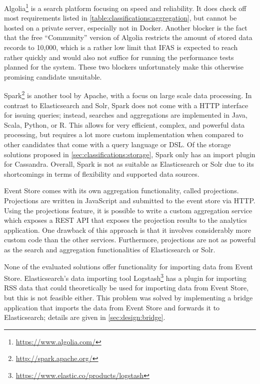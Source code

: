 Algolia\footnote{\url{https://www.algolia.com/}} is a search platform focusing on speed and reliability.
It does check off most requirements listed in \cref{table:classifications:aggregation}, but cannot be hosted on a private server, especially not in Docker.
Another blocker is the fact that the free ``Community'' version of Algolia restricts the amount of stored data records to 10,000, which is a rather low limit that \ac{IFAS} is expected to reach rather quickly and would also not suffice for running the performance tests planned for the system.
These two blockers unfortunately make this otherwise promising candidate unsuitable.

Spark\footnote{\url{http://spark.apache.org/}} is another tool by Apache, with a focus on large scale data processing.
In contrast to Elasticsearch and Solr, Spark does not come with a HTTP interface for issuing queries; instead, searches and aggregations are implemented in Java, Scala, Python, or R.
This allows for very efficient, complex, and powerful data processing, but requires a lot more custom implementation when compared to other candidates that come with a query language or \ac{DSL}.
Of the storage solutions proposed in \cref{sec:classifications:storage}, Spark only has an import plugin for Cassandra.
Overall, Spark is not as suitable as Elasticsearch or Solr due to its shortcomings in terms of flexibility and supported data sources.

Event Store comes with its own aggregation functionality, called projections.
Projections are written in JavaScript and submitted to the event store via HTTP.
Using the projections feature, it is possible to write a custom aggregation service which exposes a \ac{REST} API that exposes the projection results to the analytics application.
One drawback of this approach is that it involves considerably more custom code than the other services.
Furthermore, projections are not as powerful as the search and aggregation functionalities of Elasticsearch or Solr.

None of the evaluated solutions offer functionality for importing data from Event Store.
Elasticsearch's data importing tool Logstash\footnote{\url{https://www.elastic.co/products/logstash}} has a plugin for importing \ac{RSS} data that could theoretically be used for importing data from Event Store, but this is not feasible either.
This problem was solved by implementing a bridge application that imports the data from Event Store and forwards it to Elasticsearch; details are given in \cref{sec:design:bridge}.

